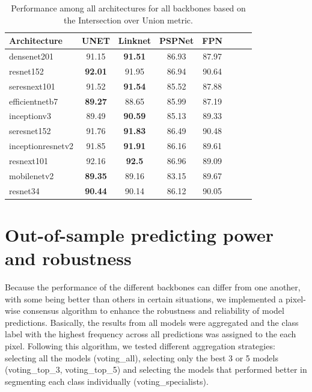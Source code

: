 \begin{table}[H]
    \centering
    \caption{Performance among all architectures for all backbones based on
        the Intersection over Union metric.}
    \label{tab:metrics-architectures}
    \begin{tabular}{lccccccc}
        \toprule
        \textbf{Architecture} & \textbf{UNET}  & \textbf{Linknet} &
        \textbf{PSPNet}       &
        \textbf{FPN}
        \\
        \midrule
        densenet201           & 91.15          & \textbf{91.51}   & 86.93
                              & 87.97
        \\
        resnet152             & \textbf{92.01} & 91.95            & 86.94
                              & 90.64
        \\
        seresnext101          & 91.52          & \textbf{91.54}   & 85.52
                              & 87.88
        \\
        efficientnetb7        & \textbf{89.27} & 88.65            & 85.99
                              & 87.19
        \\
        inceptionv3           & 89.49          & \textbf{90.59}   & 85.13
                              & 89.33
        \\
        seresnet152           & 91.76          & \textbf{91.83}   & 86.49
                              & 90.48
        \\
        inceptionresnetv2     & 91.85          & \textbf{91.91}   & 86.16
                              & 89.61
        \\
        resnext101            & 92.16          & \textbf{92.5}    & 86.96
                              & 89.09
        \\
        mobilenetv2           & \textbf{89.35} & 89.16            & 83.15
                              & 89.67
        \\
        resnet34              & \textbf{90.44} & 90.14            & 86.12
                              & 90.05
        \\
        \bottomrule
    \end{tabular}
\end{table}

\section{Out-of-sample predicting power and robustness}\label{app:out_of_sample}

Because the performance of the different backbones can differ from one
another, with some being better than others in certain situations, we
implemented a pixel-wise consensus algorithm to enhance the robustness and
reliability of model predictions. Basically, the results from all models were
aggregated and the class label with the highest frequency across all
predictions was assigned to the each pixel. Following this algorithm, we tested
different aggregation strategies: selecting all the models (voting\_all),
selecting only the best 3 or 5 models (voting\_top\_3, voting\_top\_5) and
selecting the models that performed better in segmenting each class
individually (voting\_specialists).

